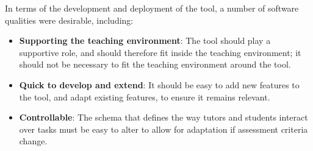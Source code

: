 \medskip

In terms of the development and deployment of the tool, a number of software qualities were desirable, including:
\begin{itemize}[noitemsep,nolistsep]
  \item \textbf{Supporting the teaching environment}: The tool should play a supportive role, and should therefore fit inside the teaching environment; it should not be necessary to fit the teaching environment around the tool.
  \item \textbf{Quick to develop and extend}: It should be easy to add new features to the tool, and adapt existing features, to ensure it remains relevant.
  \item \textbf{Controllable}: The schema that defines the way tutors and students interact over tasks must be easy to alter to allow for adaptation if assessment criteria change.
\end{itemize}



